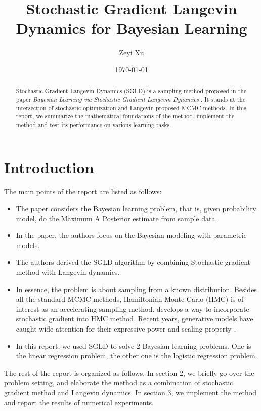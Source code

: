 \documentclass[10pt]{amsart}
\begin{document}
\title{Stochastic Gradient Langevin Dynamics for Bayesian Learning}
\author{Zeyi Xu}\date{\today}
\begin{abstract}
Stochastic Gradient Langevin Dynamics (SGLD) is a sampling method proposed in the paper \textit{Bayesian Learning via Stochastic Gradient Langevin Dynamics} \cite{10.5555/3104482.3104568}. It stands at the intersection of stochastic optimization and Langevin-proposed MCMC methods. In this report, we summarize the mathematical foundations of the method, implement the method and test its performance on various learning tasks.
\end{abstract}
\maketitle

\tableofcontents
\section{Introduction}
The main points of the report are listed as follows:
\begin{itemize}
    \item The paper considers the Bayesian learning problem, that is, given probability model, do the Maximum A Posterior estimate from sample data.
    \item In the paper, the authors focus on the Bayesian modeling with parametric models.
    \item The authors derived the SGLD algorithm by combining Stochastic gradient method with Langevin dynamics.
    \item In essence, the problem is about sampling from a known distribution. Besides all the standard MCMC methods, Hamiltonian Monte Carlo (HMC) is of interest as an accelerating sampling method. \cite{chen2014stochasticgradienthamiltonianmonte} develops a way to incorporate stochastic gradient into HMC method. Recent years, generative models have caught wide attention for their expressive power and scaling property \cite{Bond_Taylor_2022}.
    \item In this report, we used SGLD to solve 2 Bayesian learning problems. One is the linear regression problem, the other one is the logistic regression problem.
\end{itemize}
The rest of the report is organized as follows. In section 2, we briefly go over the problem setting, and elaborate the method as a combination of stochastic gradient method and Langevin dynamics. In section 3, we implement the method and report the results of numerical experiments.
\end{document}

